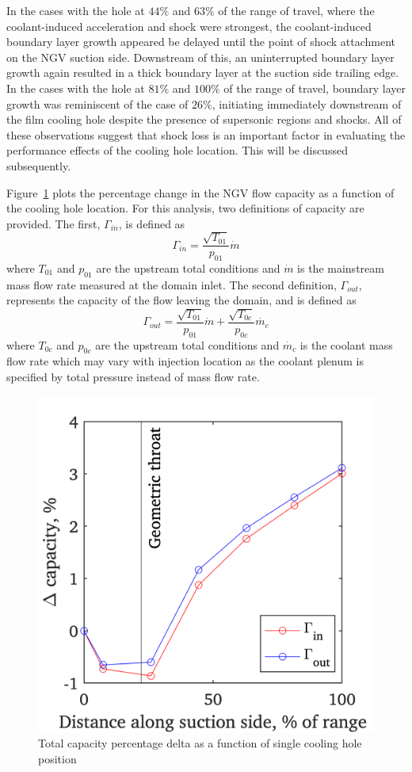 \documentclass[a4paper, 11pt, oneside]{report}
\begin{document}
In the cases with the hole at $44\%$ and $63\%$ of the range of travel, where the coolant-induced acceleration and shock were strongest, the coolant-induced boundary layer growth appeared be delayed until the point of shock attachment on the NGV suction side. Downstream of this, an uninterrupted boundary layer growth again resulted in a thick boundary layer at the suction side trailing edge. In the cases with the hole at $81\%$ and $100\%$ of the range of travel, boundary layer growth was reminiscent of the case of $26\%$, initiating immediately downstream of the film cooling hole despite the presence of supersonic regions and shocks. All of these observations suggest that shock loss is an important factor in evaluating the performance effects of the cooling hole location. This will be discussed subsequently.

Figure~\ref{fig:sch_hole_location_vs_capacity} plots the percentage change in the NGV flow capacity as a function of the cooling hole location. For this analysis, two definitions of capacity are provided. The first, $\Gamma_{in}$, is defined as
\begin{equation}
\Gamma_{in} =
\frac{\sqrt{T_{01}}}{p_{01}}
\dot{m}
\end{equation}
where $T_{01}$ and $p_{01}$ are the upstream total conditions and $\dot{m}$ is the mainstream mass flow rate measured at the domain inlet. The second definition, $\Gamma_{out}$, represents the capacity of the flow leaving the domain, and is defined as
\begin{equation}
\Gamma_{out} =
\frac{\sqrt{T_{01}}}{p_{01}}
\dot{m}
+
\frac{\sqrt{T_{0c}}}{p_{0c}}
\dot{m_c}
\end{equation}
where $T_{0c}$ and $p_{0c}$ are the upstream total conditions and $\dot{m_c}$ is the coolant mass flow rate which may vary with injection location as the coolant plenum is specified by total pressure instead of mass flow rate.

\begin{figure}[H]
      \centering
      \includegraphics[width=.45\textwidth]{figs/sch_hole_location_vs_capacity.png}
      \caption{Total capacity percentage delta as a function of single cooling hole position}
      \label{fig:sch_hole_location_vs_capacity}
\end{figure}
\end{document}
